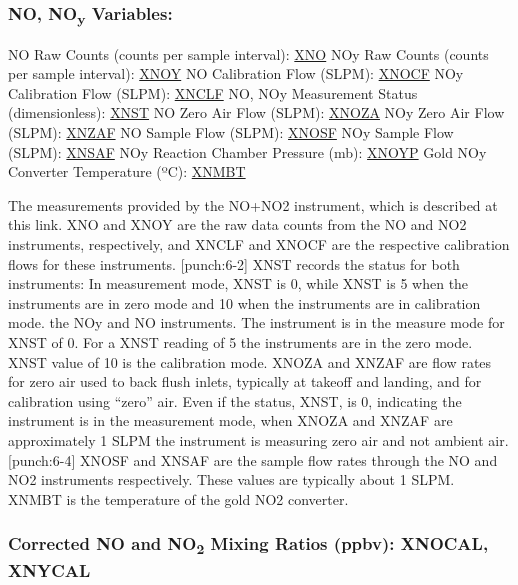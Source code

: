 \documentclass[
  english,
]{book}
\begin{document}
\hypertarget{no-noy}{%
\subsubsection*{\texorpdfstring{NO, NO\textsubscript{y} Variables:}{NO, NOy Variables:}}\label{no-noy}}

NO Raw Counts (counts per sample interval): \underline{XNO}
NOy Raw Counts (counts per sample interval): \underline{XNOY}
NO Calibration Flow (SLPM): \underline{XNOCF}
NOy Calibration Flow (SLPM): \underline{XNCLF}
NO, NOy Measurement Status (dimensionless): \underline{XNST}
NO Zero Air Flow (SLPM): \underline{XNOZA}
NOy Zero Air Flow (SLPM): \underline{XNZAF}
NO Sample Flow (SLPM): \underline{XNOSF}
NOy Sample Flow (SLPM): \underline{XNSAF}
NOy Reaction Chamber Pressure (mb): \underline{XNOYP}
Gold NOy Converter Temperature ({º}C): \underline{XNMBT}

The measurements provided by the NO+NO{2} instrument, which is described at this link. XNO and XNOY are the raw data counts from the NO and NO{2} instruments, respectively, and XNCLF and XNOCF are the respective calibration flows for these instruments. \protect\hypertarget{punch:6-2}{}{{[}punch:6-2{]}} XNST records the status for both instruments: In measurement mode, XNST is 0, while XNST is 5 when the instruments are in zero mode and 10 when the instruments are in calibration mode. the NOy and NO instruments. The instrument is in the measure mode for XNST of 0. For a XNST reading of 5 the instruments are in the zero mode. XNST value of 10 is the calibration mode. XNOZA and XNZAF are flow rates for zero air used to back flush inlets, typically at takeoff and landing, and for calibration using ``zero'' air. Even if the status, XNST, is 0, indicating the instrument is in the measurement mode, when XNOZA and XNZAF are approximately 1 SLPM the instrument is measuring zero air and not ambient air. \protect\hypertarget{punch:6-4}{}{{[}punch:6-4{]}} XNOSF and XNSAF are the sample flow rates through the NO and NO{2} instruments respectively. These values are typically about 1 SLPM. XNMBT is the temperature of the gold NO{2} converter.

\hypertarget{mr-no-no2}{%
\subsubsection*{\texorpdfstring{Corrected NO and NO\textsubscript{2} Mixing Ratios (ppbv): XNOCAL, XNYCAL}{Corrected NO and NO2 Mixing Ratios (ppbv): XNOCAL, XNYCAL}}\label{mr-no-no2}}
\end{document}
